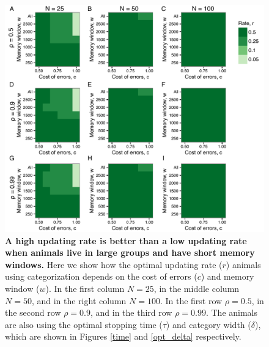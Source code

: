 \begin{figure}
\includegraphics[width=6.85in]{figures/l_heat_maps.pdf}
\caption{\sffamily\small\textbf{A high updating rate is better than a low updating rate when animals live in large groups and have short memory windows.} Here we show how the optimal updating rate ($r$) animals using categorization depends on the cost of errors ($c$) and memory window ($w$). In the first column $N=25$, in the middle column $N=50$, and in the right column $N=100$. In the first row $\rho=0.5$, in the second row $\rho=0.9$, and in the third row $\rho=0.99$. The animals are also using the optimal stopping time ($\tau$) and category width ($\delta$), which are shown in Figures \ref{time} and \ref{opt_delta} respectively.}
\label{l}
\end{figure} 



